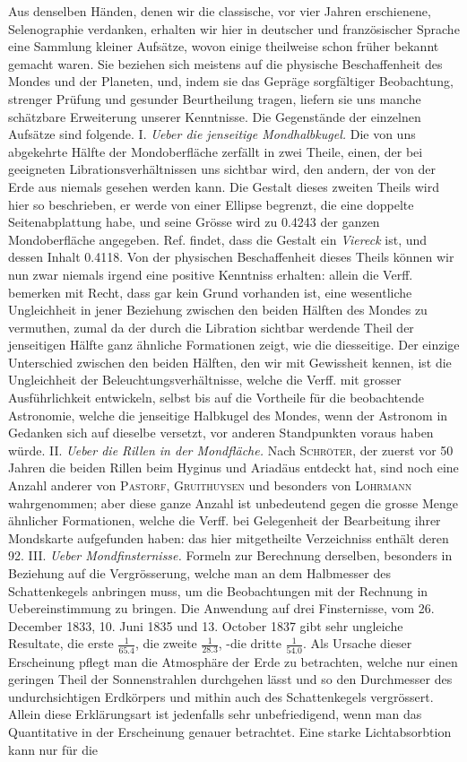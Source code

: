 Aus denselben Händen, denen wir die classische, vor vier Jahren erschienene, Selenographie verdanken, erhalten wir hier in deutscher und französischer Sprache eine Sammlung kleiner Aufsätze, wovon einige theilweise schon früher bekannt gemacht waren. Sie beziehen sich meistens auf die physische Beschaffenheit des Mondes und der Planeten, und, indem sie das Gepräge sorgfältiger Beobachtung, strenger Prüfung und gesunder Beurtheilung tragen, liefern sie uns manche schätzbare Erweiterung unserer Kenntnisse. Die Gegenstände der einzelnen Aufsätze sind folgende. I. \emph{Ueber die jenseitige Mondhalbkugel.} Die von uns abgekehrte Hälfte der Mondoberfläche zerfällt in zwei Theile, einen, der bei geeigneten Librationsverhältnissen uns sichtbar wird, den andern, der von der Erde aus niemals gesehen werden kann. Die Gestalt dieses zweiten Theils wird hier so beschrieben, er werde von einer Ellipse begrenzt, die eine doppelte Seitenabplattung habe, und seine Grösse wird zu 0.4243 der ganzen Mondoberfläche angegeben. Ref. findet, dass die Gestalt ein \emph{Viereck} ist, und dessen Inhalt 0.4118. Von der physischen Beschaffenheit dieses Theils können wir nun zwar niemals irgend eine positive Kenntniss erhalten: allein die Verff. bemerken mit Recht, dass gar kein Grund vorhanden ist, eine wesentliche Ungleichheit in jener Beziehung zwischen den beiden Hälften des Mondes zu vermuthen, zumal da der durch die Libration sichtbar werdende Theil der jenseitigen Hälfte ganz ähnliche Formationen zeigt, wie die diesseitige. Der einzige Unterschied zwischen den beiden Hälften, den wir mit Gewissheit kennen, ist die Ungleichheit der Beleuchtungsverhältnisse, welche die Verff. mit grosser Ausführlichkeit entwickeln, selbst bis auf die Vortheile für die beobachtende Astronomie, welche die jenseitige Halbkugel des Mondes, wenn der Astronom in Gedanken sich auf dieselbe versetzt, vor anderen Standpunkten voraus haben würde. II. \emph{Ueber die Rillen in der Mondfläche.} Nach \textsc{Schröter}, der zuerst vor 50 Jahren die beiden Rillen beim Hyginus und Ariadäus entdeckt hat, sind noch eine Anzahl anderer von \textsc{Pastorf}, \textsc{Gruithuysen} und besonders von \textsc{Lohrmann} wahrgenommen; aber diese ganze Anzahl ist unbedeutend gegen die grosse Menge ähnlicher Formationen, welche die Verff. bei Gelegenheit der Bearbeitung ihrer Mondskarte aufgefunden haben: das hier mitgetheilte Verzeichniss enthält deren 92. III. \emph{Ueber Mondfinsternisse.} Formeln zur Berechnung derselben, besonders in Beziehung auf die Vergrösserung, welche man an dem Halbmesser des Schattenkegels anbringen muss, um die Beobachtungen mit der Rechnung in Uebereinstimmung zu bringen. Die Anwendung auf drei Finsternisse, vom 26. December 1833, 10. Juni 1835 und 13. October 1837 gibt sehr ungleiche Resultate, die erste $\frac{1}{65.4}$, die zweite $\frac{1}{28.3}$, -die dritte $\frac{1}{54.0}$. Als Ursache dieser Erscheinung pflegt man die Atmosphäre der Erde zu betrachten, welche nur einen geringen Theil der Sonnenstrahlen durchgehen lässt und so den Durchmesser des undurchsichtigen Erdkörpers und mithin auch des Schattenkegels vergrössert. Allein diese Erklärungsart ist jedenfalls sehr unbefriedigend, wenn man das Quantitative in der Erscheinung genauer betrachtet. Eine starke Lichtabsorbtion kann nur für die 